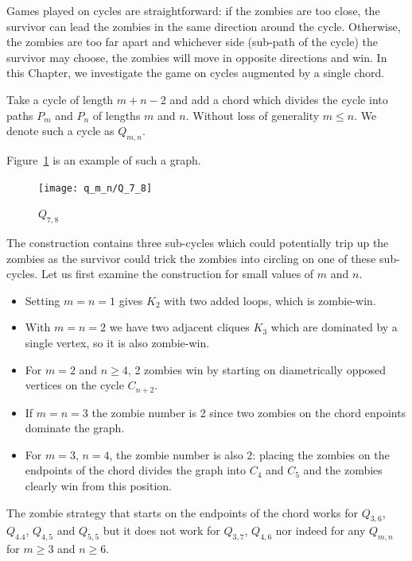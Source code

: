 Games played on cycles are straightforward: if the zombies are too close, the survivor can lead
the zombies in the same direction around the cycle. Otherwise, the zombies are too far apart and whichever side (sub-path of the cycle) the survivor may choose, the zombies will move in opposite directions and win. In this Chapter, we investigate the game on cycles augmented by a single chord.

\begin{definition}
 Take a cycle of length $m+n-2$ and add a chord which
 divides the cycle into paths $P_m$ and $P_n$ of lengths $m$ and $n$.
 Without loss of generality $m \leq n$. We denote such a cycle as $Q_{m,n}$.
\end{definition}

Figure~\ref{fig:Q_7_8} is an example of such a graph.

\begin{figure}
  \centering
 \texttt{[image: q\_m\_n/Q\_7\_8]}
 \caption{$Q_{7,8}$ \label{fig:Q_7_8}}
\end{figure}

The construction contains three sub-cycles which could potentially
trip up the zombies as the survivor could trick the zombies into circling
on one of these sub-cycles.
Let us first examine the construction for small values of $m$ and $n$.

 \begin{itemize}
  \item Setting $m=n=1$ gives $K_2$ with two added loops, which is zombie-win.

  \item With $m=n=2$ we have two adjacent cliques $K_3$ which are dominated by a single vertex,
  so it is also zombie-win.

  \item For $m=2$ and $n\geq 4$, 2 zombies win by starting on diametrically
  opposed vertices on the cycle $C_{n+2}$.

  \item If $m=n=3$ the zombie number is 2 since two zombies on the chord enpoints dominate the graph.

  \item For $m=3$, $n=4$, the zombie number is also 2: placing the zombies on the endpoints
  of the chord divides the graph into $C_4$ and $C_5$ and the zombies clearly win from this
  position.

\end{itemize}

The zombie strategy that starts on the endpoints of the chord works for $Q_{3,6}$, $Q_{4.4}$, $Q_{4,5}$ and $Q_{5,5}$ but it does
not work for $Q_{3,7}$, $Q_{4,6}$ nor indeed for any $Q_{m,n}$ for $m \geq 3$ and $n \geq 6$.

